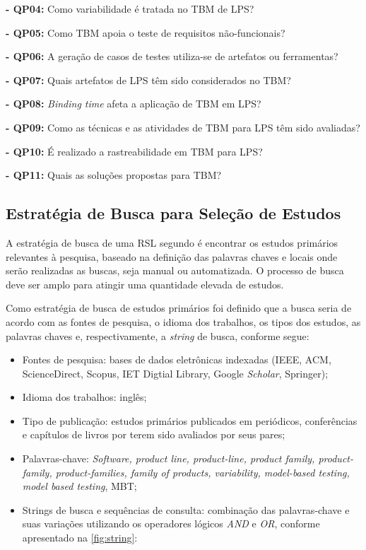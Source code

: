 \textbf{- QP04:} Como variabilidade é tratada no TBM de LPS?

\textbf{- QP05:} Como TBM apoia o teste de requisitos não-funcionais?

\textbf{- QP06:} A geração de casos de testes utiliza-se de artefatos ou ferramentas?

\textbf{- QP07:} Quais artefatos de LPS têm sido considerados no TBM?

\textbf{- QP08:} \textit{Binding time} afeta a aplicação de TBM em LPS?

\textbf{- QP09:} Como as técnicas e as atividades de TBM para LPS têm sido avaliadas?

\textbf{- QP10:} É realizado a rastreabilidade em TBM para LPS?

\textbf{- QP11:} Quais as soluções propostas para TBM?

\subsection{Estratégia de Busca para Seleção de Estudos}
A estratégia de busca de uma RSL segundo \cite{keele2007guidelines} é encontrar os estudos primários relevantes à pesquisa, baseado na definição das palavras chaves e locais onde serão realizadas as buscas, seja manual ou automatizada. O processo de busca deve ser amplo para atingir uma quantidade elevada de estudos.

Como estratégia de busca de estudos primários foi definido que a busca seria de acordo com as fontes de pesquisa, o idioma dos trabalhos, os tipos dos estudos, as palavras chaves e, respectivamente, a \textit{string} de busca, conforme segue:

\begin{itemize}
	\item Fontes de pesquisa: bases de dados eletrônicas indexadas (IEEE, ACM, ScienceDirect, Scopus, IET Digtial Library, Google \textit{Scholar}, Springer);
	
	\item Idioma dos trabalhos: inglês;
	
	\item Tipo de publicação: estudos primários publicados em periódicos, conferências
	e capítulos de livros por terem sido avaliados por seus pares;
	
	\item Palavras-chave: \textit{Software, product line, product-line, product family, product-family, product-families, family of products, variability, model-based testing, model based testing}, MBT;
	
	\item Strings de busca e sequências de consulta: combinação das palavras-chave e suas variações utilizando os operadores lógicos \textit{AND} e \textit{OR}, conforme apresentado na \ref{fig:string}:
\end{itemize}


